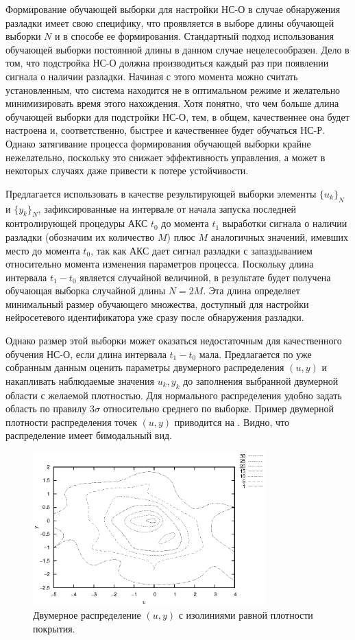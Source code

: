 Формирование обучающей выборки для настройки НС-О в случае обнаружения
разладки имеет свою специфику, что проявляется в выборе длины
обучающей выборки $N$ и в способе ее формирования. Стандартный подход
использования обучающей выборки постоянной длины в данном случае
нецелесообразен.  Дело в том, что подстройка НС-О должна производиться
каждый раз при появлении сигнала о наличии разладки.  Начиная с этого
момента можно считать установленным, что система находится не в
оптимальном режиме и желательно минимизировать время этого нахождения.
Хотя понятно, что чем больше длина обучающей выборки для подстройки
НС-О, тем, в общем, качественнее она будет настроена и,
соответственно, быстрее и качественнее будет обучаться НС-Р.  Однако
затягивание процесса формирования обучающей выборки крайне
нежелательно, поскольку это снижает эффективность управления, а может
в некоторых случаях даже привести к потере устойчивости.

Предлагается использовать в качестве результирующей выборки элементы
$\{u_k\}_N$ и $\{y_k\}_N$, зафиксированные на интервале от начала
запуска последней контролирующей процедуры АКС $t_0$ до момента $t_1$
выработки сигнала о наличии разладки (обозначим их количество $M$)
плюс $M$ аналогичных значений, имевших место до момента $t_0$, так как
АКС дает сигнал разладки с запаздыванием относительно момента
изменения параметров процесса.  Поскольку длина интервала $t_1-t_0$
является случайной величиной, в результате будет получена обучающая
выборка случайной длины $N=2M$.  Эта длина определяет минимальный
размер обучающего множества, доступный для настройки нейросетевого
идентификатора уже сразу после обнаружения разладки.

Однако размер этой выборки может оказаться недостаточным для
качественного обучения НС-О, если длина интервала $t_1-t_0$ мала.
Предлагается по уже собранным данным оценить параметры двумерного
распределения $(u,y)$ и накапливать наблюдаемые значения $u_k,y_k$ до
заполнения выбранной двумерной области с желаемой плотностью.  Для
нормального распределения удобно задать область по правилу $3\sigma$
относительно среднего по выборке.  Пример двумерной плотности
распределения точек $(u,y)$ приводится на
.  Видно, что распределение имеет
бимодальный вид.

\begin{figure}[h]
\centering
\includegraphics[width=0.8\textwidth,%
  totalheight=0.4\textheight]{u_ny_d2d_ru}
\caption{Двумерное распределение $(u,y)$ с изолиниями равной плотности
  покрытия.}
\label{fig:u_ny_d2d_ru}
\end{figure}

